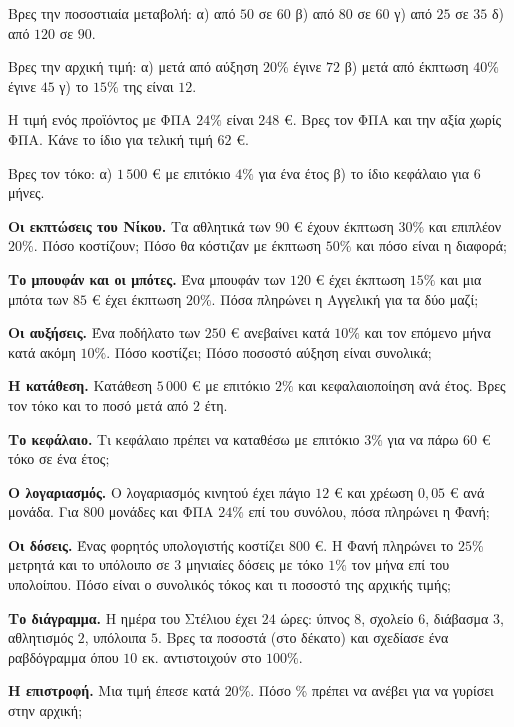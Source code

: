 \ex Βρες την ποσοστιαία μεταβολή: α) από $50$ σε $60$ \quad β) από $80$ σε $60$ \quad γ) από $25$ σε $35$ \quad δ) από $120$ σε $90$.

\ex Βρες την αρχική τιμή: α) μετά από αύξηση $20\%$ έγινε $72$ \quad β) μετά από έκπτωση $40\%$ έγινε $45$ \quad γ) το $15\%$ της είναι $12$.

\ex Η τιμή ενός προϊόντος με ΦΠΑ $24\%$ είναι $248$ €. Βρες τον ΦΠΑ και την αξία χωρίς ΦΠΑ. Κάνε το ίδιο για τελική τιμή $62$ €.

\ex Βρες τον τόκο: α) $1\,500$ € με επιτόκιο $4\%$ για ένα έτος \quad β) το ίδιο κεφάλαιο για $6$ μήνες.


\ex \textbf{Οι εκπτώσεις του Νίκου.} Τα αθλητικά των $90$ € έχουν έκπτωση $30\%$ και επιπλέον $20\%$. Πόσο κοστίζουν; Πόσο θα κόστιζαν με έκπτωση $50\%$ και πόσο είναι η διαφορά;

\ex \textbf{Το μπουφάν και οι μπότες.} Ένα μπουφάν των $120$ € έχει έκπτωση $15\%$ και μια μπότα των $85$ € έχει έκπτωση $20\%$. Πόσα πληρώνει η Αγγελική για τα δύο μαζί;

\ex \textbf{Οι αυξήσεις.} Ένα ποδήλατο των $250$ € ανεβαίνει κατά $10\%$ και τον επόμενο μήνα κατά ακόμη $10\%$. Πόσο κοστίζει; Πόσο ποσοστό αύξηση είναι συνολικά;

\ex \textbf{Η κατάθεση.} Κατάθεση $5\,000$ € με επιτόκιο $2\%$ και κεφαλαιοποίηση ανά έτος. Βρες τον τόκο και το ποσό μετά από $2$ έτη.

\ex \textbf{Το κεφάλαιο.} Τι κεφάλαιο πρέπει να καταθέσω με επιτόκιο $3\%$ για να πάρω $60$ € τόκο σε ένα έτος;

\ex \textbf{Ο λογαριασμός.} Ο λογαριασμός κινητού έχει πάγιο $12$ € και χρέωση $0{,}05$ € ανά μονάδα. Για $800$ μονάδες και ΦΠΑ $24\%$ επί του συνόλου, πόσα πληρώνει η Φανή;

\ex \textbf{Οι δόσεις.} Ένας φορητός υπολογιστής κοστίζει $800$ €. Η Φανή πληρώνει το $25\%$ μετρητά και το υπόλοιπο σε $3$ μηνιαίες δόσεις με τόκο $1\%$ τον μήνα επί του υπολοίπου. Πόσο είναι ο συνολικός τόκος και τι ποσοστό της αρχικής τιμής;

\ex \textbf{Το διάγραμμα.} Η ημέρα του Στέλιου έχει $24$ ώρες: ύπνος $8$, σχολείο $6$, διάβασμα $3$, αθλητισμός $2$, υπόλοιπα $5$. Βρες τα ποσοστά (στο δέκατο) και σχεδίασε ένα ραβδόγραμμα όπου $10$ εκ. αντιστοιχούν στο $100\%$.

\ex \textbf{Η επιστροφή.} Μια τιμή έπεσε κατά $20\%$. Πόσο \% πρέπει να ανέβει για να γυρίσει στην αρχική;

